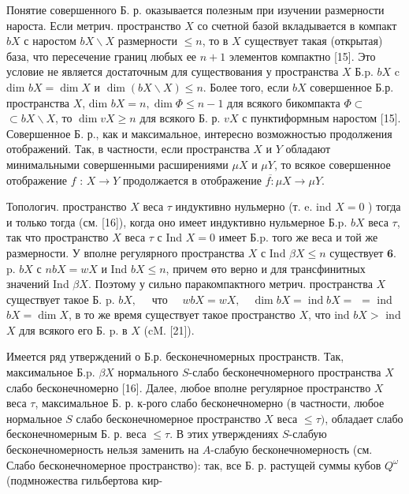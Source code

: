\documentclass[10pt]{article}
\begin{document}
Понятие совершенного Б. р. оказывается полезным при изучении размерности нароста. Если метрич. пространство $X$ со счетной базой вкладывается в компакт $b X$ с наростом $b X \backslash X$ размерности $\leqslant n$, то в $X$ существует такая (открытая) база, что пересечение границ любых ее $n+1$ элементов компактно [15]. Это условие не является достаточным для существования у пространства $X$ Б.p. $b X$ c dim $b X=\operatorname{dim} X$ и $\operatorname{dim}(b X \backslash X) \leqslant n$. Более того, если $b X$ совершенное Б.р. пространства $X$, dim $b X=n, \operatorname{dim} \Phi \leqslant n-1$ для всякого бикомпакта $\Phi \subset$ $\subset b X \backslash X$, то $\operatorname{dim} v X \geqslant n$ для всякого Б. р. $v X$ с пунктиформным наростом [15]. Совершенное Б. р., как и максимальное, интересно возможностью продолжения отображений. Так, в частности, если пространства $X$ и $Y$ обладают минимальными совершенными расширениями $\mu X$ и $\mu Y$, то всякое совершенное отображение $f$ : $X \rightarrow Y$ продолжается в отображение $\overline{f:} \mu X \rightarrow \mu Y$.



Топологич. пространство $X$ веса $\tau$ индуктивно нульмерно (т. e. ind $X=0$ ) тогда и только тогда (см. [16]), когда оно имеет индуктивно нульмерное Б.p. $b X$ веса $\tau$, так что пространство $X$ веса $\tau$ с Ind $X=0$ имеет Б.p. того же веса и той же размерности. У вполне регулярного пространства $X$ с Ind $\beta X \leqslant n$ существует $\mathbf{6}$. p. $b X$ с $n b X=w X$ и Ind $b X \leqslant n$, причем өто верно и для трансфинитных значений Ind $\beta X$. Поэтому у сильно паракомпактного метрич. пространства $X$ существует такое Б. p. $b X, \quad$ что $\quad w b X=w X, \quad \operatorname{dim} b X=\operatorname{ind} b X=$ $=$ ind $b X=\operatorname{dim} X$, в то же время существует такое пространство $X$, что ind $b X>$ ind $X$ для всякого его Б. p. в $X$ (cM. [21]).



Имеется ряд утверждений о Б.р. бесконечномерных пространств. Так, максимальное Б.p. $\beta X$ нормального $S$-слабо бесконечномерного пространства $X$ слабо бесконечномерно [16]. Далее, любое вполне регулярное пространство $X$ веса $\tau$, максимальное Б. р. к-рого слабо бесконечномерно (в частности, любое нормальное $S$ слабо бесконечномерное пространство $X$ веса $\leqslant \tau)$, обладает слабо бесконечномерным Б. р. веса $\leqslant \tau$. В этих утверждениях $S$-слабую бесконечномерность нельзя заменить на $A$-слабую бесконечномерность (см. Слабо бесконечномерное пространство): так, все Б. р. растущей суммы кубов $Q^{\omega}$ (подмножества гильбертова кир-
\end{document}
